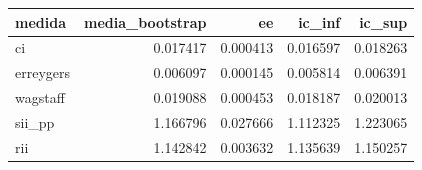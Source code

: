 \begin{tabular}{lrrrr}
\toprule
medida & media\_bootstrap & ee & ic\_inf & ic\_sup \\
\midrule
ci & 0.017417 & 0.000413 & 0.016597 & 0.018263 \\
erreygers & 0.006097 & 0.000145 & 0.005814 & 0.006391 \\
wagstaff & 0.019088 & 0.000453 & 0.018187 & 0.020013 \\
sii\_pp & 1.166796 & 0.027666 & 1.112325 & 1.223065 \\
rii & 1.142842 & 0.003632 & 1.135639 & 1.150257 \\
\bottomrule
\end{tabular}
